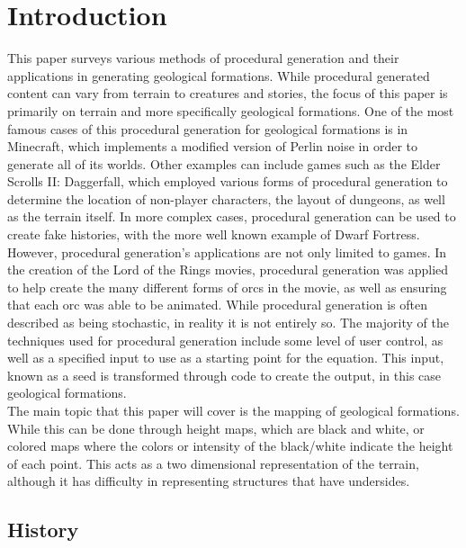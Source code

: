 \documentclass[12pt]{report}
\begin{document}
	\tableofcontents
	
	\clearpage
	
	\chapter{Introduction}
	
		This paper surveys various methods of procedural generation and their applications in generating geological formations. While procedural generated content can vary from terrain to creatures and stories, the focus of this paper is primarily on terrain and more specifically geological formations. One of the most famous cases of this procedural generation for geological formations is in Minecraft, which implements a modified version of Perlin noise in order to generate all of its worlds. Other examples can include games such as the Elder Scrolls II: Daggerfall, which employed various forms of procedural generation to determine the location of non-player characters, the layout of dungeons, as well as the terrain itself. In more complex cases, procedural generation can be used to create fake histories, with the more well known example of Dwarf Fortress. However, procedural generation's applications are not only limited to games. In the creation of the Lord of the Rings movies, procedural generation was applied to help create the many different forms of orcs in the movie, as well as ensuring that each orc was able to be animated. While procedural generation is often described as being stochastic, in reality it is not entirely so. The majority of the techniques used for procedural generation include some level of user control, as well as a specified input to use as a starting point for the equation. This input, known as a seed is transformed through code to create the output, in this case geological formations. \\
		
		The main topic that this paper will cover is the mapping of geological formations. While this can be done through height maps, which are black and white, or colored maps where the colors or intensity of the black/white indicate the height of each point. This acts as a two dimensional representation of the terrain, although it has difficulty in representing structures that have undersides. \\
		
		\section{History}
		
\end{document}
